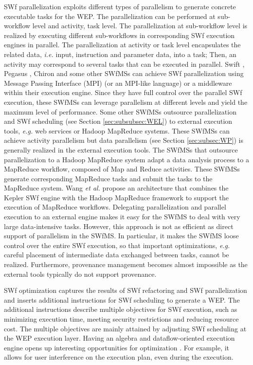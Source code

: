 SWf parallelization exploits different types of parallelism to generate concrete executable tasks for the WEP. 
The parallelization can be performed at sub-workflow level and activity, task level.
The parallelization at sub-workflow level is realized by executing different sub-workflows in corresponding SWf execution engines in parallel.
The parallelization at activity or task level encapsulates the related data, \textit{i.e.} input, instruction and parameter data, into a task; Then, an activity may correspond to several tasks that can be executed in parallel. 
Swift \cite{Zhao2007}, Pegasus \cite{Deelman2005}, Chiron \cite{Ogasawara2013} and some other SWfMSs 
can achieve SWf parallelization using Message Passing Interface (MPI) \cite{Snir1998}
(or an MPI-like language) or a middleware within their execution engine.
Since they have full control over the parallel SWf execution, 
these SWfMSs can leverage parallelism at different levels and yield the maximum level of performance.
Some other SWfMSs outsource parallelization and SWf scheduling (see Section \ref{sec:subsubsec:WEL}) to external execution tools, 
\textit{e.g.} web services or Hadoop MapReduce systems. 
These SWfMSs can achieve activity parallelism but 
data parallelism (see Section \ref{sec:subsec:WP}) is generally realized in the external execution tools.
The SWfMSs that outsource parallelization to a Hadoop MapReduce system adapt a data analysis process to a MapReduce workflow, 
composed of Map and Reduce activities. 
These SWfMSs generate corresponding MapReduce tasks and submit the tasks to the MapReduce system. 
Wang \textit{et al.} \cite{Wang2009} propose an architecture that combines the Kepler SWf engine with the Hadoop MapReduce
framework to support the execution of MapReduce workflows. 
Delegating parallelization and parallel execution to an external engine makes it easy for the SWfMS to deal with very large data-intensive tasks. 
However, this approach is not as efficient as direct support of parallelism in the SWfMS. 
In particular, it makes the SWfMS loose control over the entire SWf execution, 
so that important optimizations, \textit{e.g.} careful placement of intermediate data exchanged between tasks, cannot be realized. 
Furthermore, provenance management becomes almost impossible as the external tools typically do not support provenance.


SWf optimization captures the results of SWf refactoring and SWf parallelization and inserts additional instructions for SWf scheduling to generate a WEP. 
The additional instructions describe multiple objectives for SWf execution, such as minimizing execution time, meeting security restrictions and reducing resource cost.
The multiple objectives are mainly attained by adjusting SWf
scheduling at the WEP execution layer.
Having an algebra and dataflow-oriented execution engine opens up
interesting opportunities for optimization
\cite{Dias2013,Chirigati2012}.
For example, it allows for user interference on the execution plan, even during the execution.

